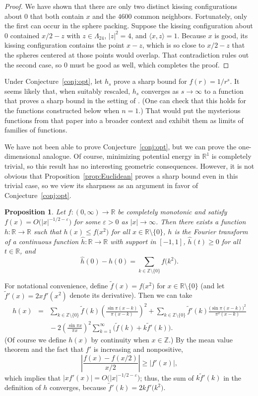 \documentclass{jams-l}
\theoremstyle{plain}
\newtheorem{proposition}[theorem]{Proposition}
\numberwithin{theorem}{section}
\theoremstyle{definition}
\numberwithin{equation}{section}
\newcommand{\R}{{\mathbb R}}
\newcommand{\Z}{{\mathbb Z}}
\newcommand{\ft}{\widetilde{f}}
\newcommand{\co}{\colon}
\begin{document}
\begin{proof}
We have shown that there are only two distinct kissing
configurations about $0$ that both contain $x$ and the $4600$
common neighbors.  Fortunately, only the first can occur in the
sphere packing.  Suppose the kissing configuration about $0$
contained $x/2-z$ with $z \in \Lambda_{24}$, $|z|^2=4$, and
$\langle x,z \rangle = 1$. Because $x$ is good, its kissing
configuration contains the point $x-z$, which is so close to
$x/2-z$ that the spheres centered at those points would overlap.
That contradiction rules out the second case, so $0$ must be good
as well, which completes the proof.
\end{proof}

Under Conjecture~\ref{conj:opt}, let $h_s$ prove a sharp bound for
$f(r)=1/r^s$.  It seems likely that, when suitably rescaled, $h_s$
converges as $s \to \infty$ to a function that proves a sharp
bound in the setting of \cite{CE}.  (One can check that this holds
for the functions constructed below when $n=1$.)  That would put
the mysterious functions from that paper into a broader context
and exhibit them as limits of families of functions.

We have not been able to prove Conjecture~\ref{conj:opt}, but we
can prove the one-dimensional analogue.  Of course, minimizing
potential energy in $\R^1$ is completely trivial, so this result
has no interesting geometric consequences.  However, it is not
obvious that Proposition~\ref{prop:Euclidean} proves a sharp bound
even in this trivial case, so we view its sharpness as an argument
in favor of Conjecture~\ref{conj:opt}.

\begin{proposition}\label{prop:onedim}
Let $f \co (0,\infty) \to \R$ be completely monotonic and satisfy
$f(x) = O\big(|x|^{-1/2-\varepsilon}\big)$ for some
$\varepsilon>0$ as $|x| \to \infty$. Then there exists a function
$h \co \R \to \R$ such that $h(x) \le f\big(x^2\big)$ for all $x
\in \R \setminus \{0\}$, $h$ is the Fourier transform of a
continuous function $\widehat{h} \co \R \to \R$ with support in
$[-1,1]$, $\widehat{h}(t) \ge 0$ for all $t \in \R$, and
$$
\widehat{h}(0)-h(0) = \sum_{k \in \Z\setminus \{0\}}
f\big(k^2\big).
$$
\end{proposition}

For notational convenience, define $\ft(x) = f\big(x^2\big)$ for
$x \in \R\setminus \{0\}$ (and let $\ft'(x) = 2xf'(x^2)$ denote
its derivative). Then we can take
\begin{eqnarray*}
h(x) &=& \sum_{k \in \Z\setminus\{0\}} \ft(k) \left(\frac{\sin
\pi(x-k)}{\pi (x-k)}\right)^2 + \sum_{k \in \Z\setminus\{0\}}
\ft'(k) \frac{\big(\sin \pi(x-k)\big)^2}{\pi^2(x-k)}\\
&& \phantom{} - 2 \left(\frac{\sin \pi x}{\pi x}\right)^2
\sum_{k=1}^\infty \big(\ft(k)+k\ft'(k)\big).
\end{eqnarray*}
(Of course we define $h(x)$ by continuity when $x \in \Z$.) By the
mean value theorem and the fact that $f'$ is increasing and
nonpositive,
$$
\left|\frac{f(x)-f(x/2)}{x/2}\right| \ge |f'(x)|,
$$
which implies that $|xf'(x)| = O\big(|x|^{-1/2-\varepsilon}\big)$;
thus, the sum of $k \ft'(k)$ in the definition of $h$ converges,
because $\ft'(k) = 2k f'\big(k^2\big)$.
\end{document}
